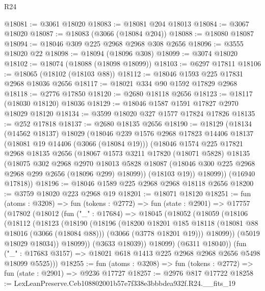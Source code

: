 \begin{lexlean}{R24}
\begin{coremodule}
@18081 := @3061 @18020
@18083 := @18081 @204 @18013
@18084 := @3067 @18020
@18087 := @18083 (@3066 (@18084 @204))
@18088 := @18080 @18087
@18094 := @18046 @309 @225 @2968 @2968 @308 @2656
@18096 := @3555 @18020 @22
@18098 := @18094 (@18096 @308)
@18099 := @3074 @18020
@18102 := @18074 (@18088 (@18098 @18099))
@18103 := @6297 @17811
@18106 := @18065 (@18102 (@18103 @88))
@18112 := @18046 @1593 @225 @17831 @2968 @18036 @2656
@18117 := @18021 @334 @90 @1592 @17829 @2968
@18118 := @2776 @17850
@18120 := @2680 @18118 @2656
@18123 := @18117 (@18030 @18120) @18036
@18129 := @18046 @1587 @1591 @17827 @2970 @18029 @18120
@18134 := @3599 @18020 @327 @1577 @17824 @17826
@18135 := @252 @17818
@18137 := @2680 @18135 @2656
@18190 := @18129
    (@18134
      (@14562 @18137)
      @18029
      (@18046
        @239
        @1576
        @2968
        @17823
        @14406
        @18137
        (@18081 @19 @14406 (@3066 (@18084 @19)))
        (@18046
          @1574
          @225
          @17821
          @2968
          @18135
          @2656
          (@18067
            @1573
            @3211
            @17820
            (@18071 @5828)
            @18135
            (@18075
              @302
              @2968
              @2970
              @18013
              @5828
              @18087
              (@18046 @300 @225 @2968 @2968 @299 @2656 (@18096 @299) @18099))
            (@18103 @19))
          @18099))
      (@16940 @17818))
@18196 := @18046 @1589 @225 @2968 @2968 @18118 @2656
@18200 := @3759 @18020 @223 @2968 @19
@18201 := @18071 @18120
@18251 := fun (atoms : @3208) =>
  fun (tokens : @2772) =>
  fun (state : @2901) =>
  @17757
    (@17802
      (@18012
        (fun ("_" : @17684) =>
        @18045
          (@18052
            (@18059
              (@18106
                (@18112
                  (@18123
                    (@18190
                      (@18196
                        (@18200
                          @18201
                          @185
                          @18118
                          (@18081 @88 @18016 (@3066 (@18084 @88)))
                          (@3066 (@3778 @18201 @19)))
                        @18099))
                    (@5019 @18029 @18034))
                  @18099))
              (@3633 @18039))
            @18099)
          (@6311 @18040))
        (fun ("_" : @17683 @3157) => @18021 @618 @1413 @225 @2968 @2968 @2656 @5498 @18099 @5525)))
@18255 := fun (atoms : @3208) => fun (tokens : @2772) => fun (state : @2901) => @9236 @17727
@18257 := @2976 @817 @17722
@18258 := LexLeanPreserve.Ceb108802001b57e7f338e3bbbdea932f.R24.__fits_19

\end{coremodule}
\end{lexlean}
